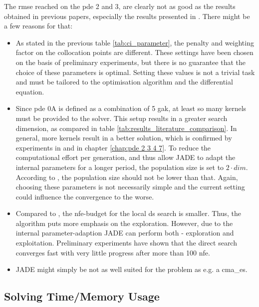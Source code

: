 \documentclass[./\jobname.tex]{subfiles}
\begin{document}
The \gls{rmse} reached on the \gls{pde} 2 and 3, are clearly not as good as the results obtained in previous papers, especially the results presented in \cite{chaquet_using_2019}. There might be a few reasons for that: 
\begin{itemize}
	\item As stated in the previous table \ref{tab:ci_parameter}, the penalty and weighting factor on the collocation points are different. These settings have been chosen on the basis of preliminary experiments, but there is no guarantee that the choice of these parameters is optimal. Setting these values is not a trivial task and must be tailored to the optimisation algorithm and the differential equation. 
	\item Since \gls{pde} 0A is defined as a combination of 5 \gls{gak}, at least so many kernels must be provided to the solver. This setup results in a greater search dimension, as compared in table \ref{tab:results_literature_comparison}. In general, more kernels result in a better solution, which is confirmed by experiments in \cite{chaquet_using_2019} and in chapter \ref{chap:pde 2 3 4 7}. 
	To reduce the computational effort per generation, and thus allow JADE to adapt the internal parameters for a longer period, the population size is set to $2 \cdot dim$. According to \cite{mallipeddi_empirical_2008}, the population size should not be lower than that. Again, choosing these parameters is not necessarily simple and the current setting could influence the convergence to the worse. 
	\item Compared to \cite{chaquet_using_2019}, the \gls{nfe}-budget for the local \gls{ds} search is smaller. Thus, the algorithm puts more emphasis on the exploration. However, due to the internal parameter-adaption JADE can perform both - exploration and exploitation. Preliminary experiments have shown that the direct search converges fast with very little progress after more than 100 \gls{nfe}.  
	\item JADE might simply be not as well suited for the problem as e.g. a \gls{cma_es}. 
\end{itemize}



\subsection{Solving Time/Memory Usage}
\end{document}
